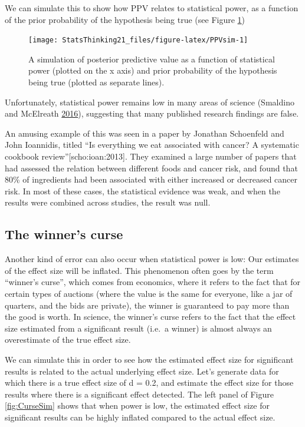 \documentclass[12pt,]{book}
\theoremstyle{definition}
\theoremstyle{definition}
\theoremstyle{definition}
\theoremstyle{remark}
\begin{document}
We can simulate this to show how PPV relates to statistical power, as a function of the prior probability of the hypothesis being true (see Figure \ref{fig:PPVsim})

\begin{figure}
\texttt{[image: StatsThinking21\_files/figure-latex/PPVsim-1]} \caption{A simulation of posterior predictive value as a function of statistical power (plotted on the x axis) and prior probability of the hypothesis being true (plotted as separate lines).}\label{fig:PPVsim}
\end{figure}

Unfortunately, statistical power remains low in many areas of science (Smaldino and McElreath \protect\hyperlink{ref-smal:mcel:2016}{2016}), suggesting that many published research findings are false.

An amusing example of this was seen in a paper by Jonathan Schoenfeld and John Ioannidis, titled ``Is everything we eat associated with cancer? A systematic cookbook review''{[}scho:ioan:2013{]}. They examined a large number of papers that had assessed the relation between different foods and cancer risk, and found that 80\% of ingredients had been associated with either increased or decreased cancer risk. In most of these cases, the statistical evidence was weak, and when the results were combined across studies, the result was null.

\hypertarget{the-winners-curse}{%
\subsection{The winner's curse}\label{the-winners-curse}}

Another kind of error can also occur when statistical power is low: Our estimates of the effect size will be inflated. This phenomenon often goes by the term ``winner's curse'', which comes from economics, where it refers to the fact that for certain types of auctions (where the value is the same for everyone, like a jar of quarters, and the bids are private), the winner is guaranteed to pay more than the good is worth. In science, the winner's curse refers to the fact that the effect size estimated from a significant result (i.e.~a winner) is almost always an overestimate of the true effect size.

We can simulate this in order to see how the estimated effect size for significant results is related to the actual underlying effect size. Let's generate data for which there is a true effect size of d = 0.2, and estimate the effect size for those results where there is a significant effect detected. The left panel of Figure \ref{fig:CurseSim} shows that when power is low, the estimated effect size for significant results can be highly inflated compared to the actual effect size.
\end{document}
